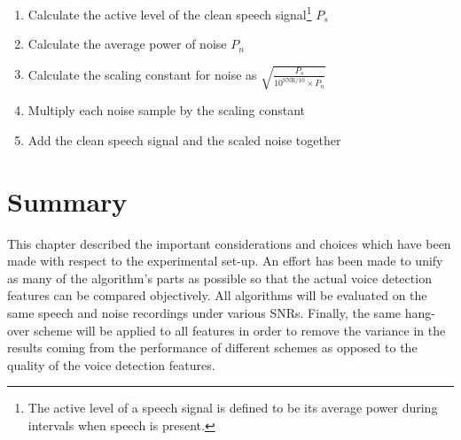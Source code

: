 \begin{enumerate}
\item Calculate the active level of the clean speech signal\footnote{The active level of a speech signal is defined to be its average power during intervals when speech is present.} $P_s$
\item Calculate the average power of noise $P_n$
\item Calculate the scaling constant for noise as $\sqrt{\frac{P_s}{10^{\text{SNR}/10} \times P_n}}$
\item Multiply each noise sample by the scaling constant
\item Add the clean speech signal and the scaled noise together
\end{enumerate}


\section{Summary}

This chapter described the important considerations and choices which have been made with respect to the experimental set-up. An effort has been made to unify as many of the algorithm's parts as possible so that the actual voice detection features can be compared objectively. All algorithms will be evaluated on the same speech and noise recordings under various SNRs. Finally, the same hang-over scheme will be applied to all features in order to remove the variance in the results coming from the performance of different schemes as opposed to the quality of the voice detection features.